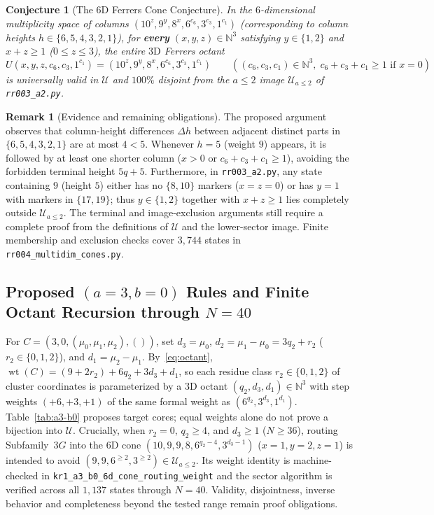 \documentclass[11pt]{article}
\newtheorem{conjecture}[theorem]{Conjecture}
\theoremstyle{definition}
\newtheorem{remark}[theorem]{Remark}
\newcommand{\N}{\mathbb{N}}
\begin{document}
\begin{conjecture}[The 6D Ferrers Cone Conjecture]
\label{thm:6d-cone}
In the $6$-dimensional multiplicity space of columns $(10^z, 9^y, 8^x, 6^{c_6}, 3^{c_3}, 1^{c_1})$ (corresponding to column heights $h \in \{6, 5, 4, 3, 2, 1\}$), for \textbf{every} $(x, y, z) \in \N^3$ satisfying $y \in \{1, 2\}$ and $x + z \ge 1$ ($0 \le z \le 3$), the entire $3\mathrm{D}$ Ferrers octant
\[
  U(x, y, z, c_6, c_3, 1^{c_1}) = (10^z, 9^y, 8^x, 6^{c_6}, 3^{c_3}, 1^{c_1}) \qquad ((c_6, c_3, c_1) \in \N^3,\; c_6 + c_3 + c_1 \ge 1 \text{ if } x = 0)
\]
is universally valid in $\mathcal{U}$ and $100\%$ disjoint from the $a \le 2$ image $\mathcal{U}_{a \le 2}$ of \texttt{rr003\_a2.py}.
\end{conjecture}
\begin{remark}[Evidence and remaining obligations]
The proposed argument observes that column-height differences $\Delta h$ between adjacent distinct parts in $\{6, 5, 4, 3, 2, 1\}$ are at most $4 < 5$. Whenever $h = 5$ (weight $9$) appears, it is followed by at least one shorter column ($x > 0$ or $c_6 + c_3 + c_1 \ge 1$), avoiding the forbidden terminal height $5q + 5$. Furthermore, in \texttt{rr003\_a2.py}, any state containing $9$ (height $5$) either has no $\{8, 10\}$ markers ($x = z = 0$) or has $y = 1$ with markers in $\{17, 19\}$; thus $y \in \{1, 2\}$ together with $x + z \ge 1$ lies completely outside $\mathcal{U}_{a \le 2}$. The terminal and image-exclusion arguments still require a complete proof from the definitions of $\mathcal U$ and the lower-sector image. Finite membership and exclusion checks cover $3{,}744$ states in \nolinkurl{rr004_multidim_cones.py}.
\end{remark}

\subsection{Proposed $(a=3,b=0)$ Rules and Finite Octant Recursion through $N=40$}

For $C = (3, 0, (\mu_0, \mu_1, \mu_2), ())$, set $d_3 = \mu_0$, $d_2 = \mu_1 - \mu_0 = 3q_2 + r_2$ ($r_2 \in \{0, 1, 2\}$), and $d_1 = \mu_2 - \mu_1$. By~\eqref{eq:octant}, $\operatorname{wt}(C) = (9 + 2r_2) + 6q_2 + 3d_3 + d_1$, so each residue class $r_2 \in \{0, 1, 2\}$ of cluster coordinates is parameterized by a $3\mathrm{D}$ octant $(q_2, d_3, d_1) \in \N^3$ with step weights $(+6, +3, +1)$ of the same formal weight as $(6^{q_2}, 3^{d_3}, 1^{d_1})$. Table~\ref{tab:a3-b0} proposes target cores; equal weights alone do not prove a bijection into $\mathcal U$. Crucially, when $r_2 = 0$, $q_2 \ge 4$, and $d_3 \ge 1$ ($N \ge 36$), routing Subfamily~$3G$ into the 6D cone $(10, 9, 9, 8, 6^{q_2-4}, 3^{d_3-1})$ ($x=1, y=2, z=1$) is intended to avoid $(9, 9, 6^{\ge 2}, 3^{\ge 2}) \in \mathcal{U}_{a \le 2}$. Its weight identity is machine-checked in \nolinkurl{kr1_a3_b0_6d_cone_routing_weight} and the sector algorithm is verified across all $1{,}137$ states through $N=40$. Validity, disjointness, inverse behavior and completeness beyond the tested range remain proof obligations.
\end{document}
